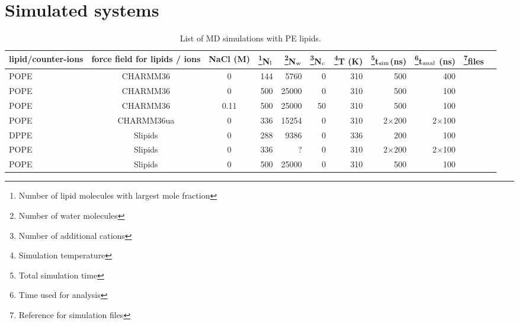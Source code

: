 \documentclass[journal=jpcbfk]{achemso}
\begin{document}
\section{Simulated systems}


%
\begin{sidewaystable*}[!p]
  \centering
  \caption{List of MD simulations with PE lipids.
  }\label{systemsPE}
  \begin{minipage}[t]{\textwidth}
    \begin{tabular}{l c c r r r r r r c c}
      lipid/counter-ions & force field for lipids / ions  & NaCl (M) & \footnote{Number of lipid molecules with largest mole fraction}N$_{\rm l}$   &  \footnote{Number of water molecules}N$_{\rm w}$   & \footnote{Number of additional cations}N$_{\rm c}$   & \footnote{Simulation temperature}T (K)  & \footnote{Total simulation time}t$_{{\rm sim}}$(ns) & \footnote{Time used for analysis}t$_{{\rm anal}}$ (ns) &   \footnote{Reference for simulation files}files\\
      \hline
      POPE  & CHARMM36 \cite{??}           &0       & 144	& 5760  &0    & 310  & 500          & 400          & \cite{charmm36POPEfiles} \\
      POPE  & CHARMM36 \cite{??}           & 0      & 500       & 25000 & 0   &  310  & 500 & 100 & \cite{POPEcharmm} \\
      POPE  & CHARMM36 \cite{??}           & 0.11   & 500       & 25000 & 50  &  310  & 500 & 100 & \cite{POPEcharmm150mMNaCl} \\
      POPE  & CHARMM36ua \cite{??}         &0       & 336	& 15254 &0    & 310  & 2$\times$200 & 2$\times$100 & \cite{charmm36uaPOPEfiles}  \\
      \hline
      DPPE  & Slipids \cite{jambeck12b}    &0    & 288 	& 9386  &0    & 336  & 200 & 100 & \cite{slipidsDPPEfiles}  \\
      POPE  & Slipids \cite{jambeck12b} &0    & 336	& ?     &0    & 310  & 2$\times$200 &  2$\times$100 & \cite{slipidsPOPEfiles}  \\
      POPE  & Slipids \cite{jambeck12b}            & 0    & 500 & 25000 & 0   &  310  & 500 & 100 & \cite{POPEslipids} \\

\end{tabular}
\end{minipage}
\end{sidewaystable*}
\end{document}
